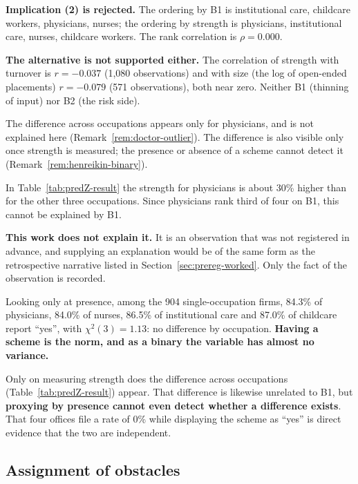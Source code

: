 \textbf{Implication (2) is rejected.} The ordering by B1 is institutional care, childcare
workers, physicians, nurses; the ordering by strength is physicians, institutional care, nurses,
childcare workers. The rank correlation is $\rho=0.000$.

\textbf{The alternative is not supported either.} The correlation of strength with turnover is
$r=-0.037$ (1{,}080 observations) and with size (the log of open-ended placements) $r=-0.079$
(571 observations), both near zero. Neither B1 (thinning of input) nor B2 (the risk side).

The difference across occupations appears only for physicians, and is not explained here
(Remark~\ref{rem:doctor-outlier}).
The difference is also visible only once strength is measured; the presence or absence of a scheme
cannot detect it (Remark~\ref{rem:henreikin-binary}).

\begin{remark}
\label{rem:doctor-outlier}
In Table~\ref{tab:predZ-result} the strength for physicians is about 30\% higher than for the
other three occupations. Since physicians rank third of four on B1, this cannot be explained by
B1.

\textbf{This work does not explain it.} It is an observation that was not registered in advance,
and supplying an explanation would be of the same form as the retrospective narrative listed in
Section~\ref{sec:prereg-worked}. Only the fact of the observation is recorded.
\end{remark}

\begin{remark}
\label{rem:henreikin-binary}
Looking only at presence, among the 904 single-occupation firms, 84.3\% of physicians, 84.0\% of
nurses, 86.5\% of institutional care and 87.0\% of childcare report ``yes'', with
$\chi^2(3)=1.13$: no difference by occupation. \textbf{Having a scheme is the norm, and as a
binary the variable has almost no variance.}

Only on measuring strength does the difference across occupations
(Table~\ref{tab:predZ-result}) appear. That difference is likewise unrelated to B1, but
\textbf{proxying by presence cannot even detect whether a difference exists}. That four offices
file a rate of 0\% while displaying the scheme as ``yes'' is direct evidence that the two are
independent.
\end{remark}


\subsection{Assignment of obstacles}
\label{sec:family-assignment}


